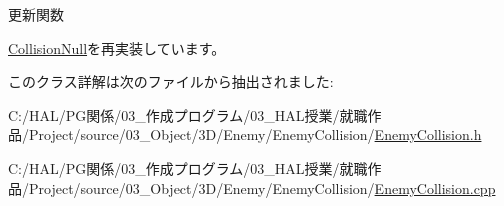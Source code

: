 更新関数 



\mbox{\hyperlink{class_collision_null_a5e5e094e3fbe3ccc0515e485c739bd15}{Collision\+Null}}を再実装しています。



このクラス詳解は次のファイルから抽出されました\+:\begin{DoxyCompactItemize}
\item 
C\+:/\+H\+A\+L/\+P\+G関係/03\+\_\+作成プログラム/03\+\_\+\+H\+A\+L授業/就職作品/\+Project/source/03\+\_\+\+Object/3\+D/\+Enemy/\+Enemy\+Collision/\mbox{\hyperlink{_enemy_collision_8h}{Enemy\+Collision.\+h}}\item 
C\+:/\+H\+A\+L/\+P\+G関係/03\+\_\+作成プログラム/03\+\_\+\+H\+A\+L授業/就職作品/\+Project/source/03\+\_\+\+Object/3\+D/\+Enemy/\+Enemy\+Collision/\mbox{\hyperlink{_enemy_collision_8cpp}{Enemy\+Collision.\+cpp}}\end{DoxyCompactItemize}
